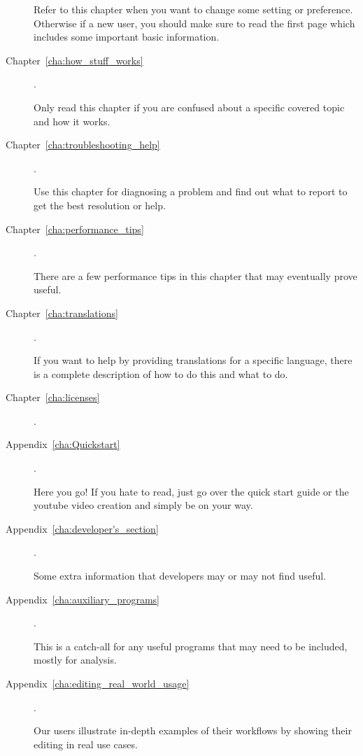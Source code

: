 \begin{description}
        Refer to this chapter when you want to change some setting or preference.
        Otherwise if a new user, you should make sure to read the first page which includes some important basic information.

    \item[Chapter~\ref{cha:how_stuff_works}] .

        Only read this chapter if you are confused about a specific covered topic and how it works.

    \item[Chapter~\ref{cha:troubleshooting_help}] .

        Use this chapter for diagnosing a problem and find out what to report to get the best resolution or help.

    \item[Chapter~\ref{cha:performance_tips}]  .

        There are a few performance tips in this chapter that may eventually prove useful.

    \item[Chapter~\ref{cha:translations}] .

        If you want to help by providing translations for a specific language, there is a complete description of how to do this and what to do.

    \item[Chapter~\ref{cha:licenses}] .

    \item[Appendix~\ref{cha:Quickstart}] .

        Here you go! If you hate to read, just go over the quick start guide or the youtube video creation and simply be on your way.

    \item[Appendix~\ref{cha:developer's_section}] .

        Some extra information that developers may or may not find useful.

    \item[Appendix~\ref{cha:auxiliary_programs}] .

        This is a catch-all for any useful programs that may need to be included, mostly for analysis.
        
     \item[Appendix~\ref{cha:editing_real_world_usage}] .
    
    	Our users illustrate in-depth examples of their workflows by showing their editing in real use cases.

\end{description}

